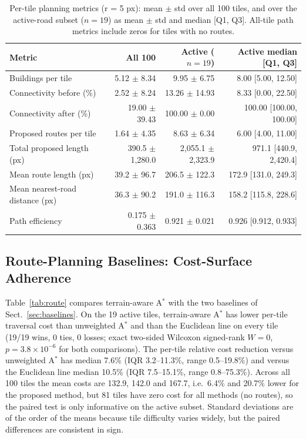 \documentclass[runningheads]{llncs}
\begin{document}
\begin{table}[t]
\caption{Per-tile planning metrics (r = 5 px): mean $\pm$ std over all 100 tiles, and over the active-road subset ($n=19$) as mean $\pm$ std and median [Q1, Q3]. All-tile path metrics include zeros for tiles with no routes.}\label{tab:n100}
\centering
\scriptsize
\setlength{\tabcolsep}{3pt}
\begin{tabular}{lrrr}
\toprule
Metric & All 100 & Active ($n=19$) & Active median [Q1, Q3]\\
\midrule
Buildings per tile & 5.12 $\pm$ 8.34 & 9.95 $\pm$ 6.75 & 8.00 [5.00, 12.50] \\
Connectivity before (\%) & 2.52 $\pm$ 8.24 & 13.26 $\pm$ 14.93 & 8.33 [0.00, 22.50] \\
Connectivity after (\%) & 19.00 $\pm$ 39.43 & 100.00 $\pm$ 0.00 & 100.00 [100.00, 100.00] \\
Proposed routes per tile & 1.64 $\pm$ 4.35 & 8.63 $\pm$ 6.34 & 6.00 [4.00, 11.00] \\
Total proposed length (px) & 390.5 $\pm$ 1,280.0 & 2,055.1 $\pm$ 2,323.9 & 971.1 [440.9, 2,420.4] \\
Mean route length (px) & 39.2 $\pm$ 96.7 & 206.5 $\pm$ 122.3 & 172.9 [131.0, 249.3] \\
Mean nearest-road distance (px) & 36.3 $\pm$ 90.2 & 191.0 $\pm$ 116.3 & 158.2 [115.8, 228.6] \\
Path efficiency & 0.175 $\pm$ 0.363 & 0.921 $\pm$ 0.021 & 0.926 [0.912, 0.933] \\
\bottomrule
\end{tabular}
\end{table}

\subsection{Route-Planning Baselines: Cost-Surface Adherence}
Table~\ref{tab:route} compares terrain-aware A$^{*}$ with the two baselines of Sect.~\ref{sec:baselines}. On the 19 active tiles, terrain-aware A$^{*}$ has lower per-tile traversal cost than unweighted A$^{*}$ and than the Euclidean line on every tile (19/19 wins, 0 ties, 0 losses; exact two-sided Wilcoxon signed-rank $W=0$, $p=3.8\times10^{-6}$ for both comparisons). The per-tile relative cost reduction versus unweighted A$^{*}$ has median 7.6\% (IQR 3.2--11.3\%, range 0.5--19.8\%) and versus the Euclidean line median 10.5\% (IQR 7.5--15.1\%, range 0.8--75.3\%). Across all 100 tiles the mean costs are 132.9, 142.0 and 167.7, i.e.\ 6.4\% and 20.7\% lower for the proposed method, but 81 tiles have zero cost for all methods (no routes), so the paired test is only informative on the active subset. Standard deviations are of the order of the means because tile difficulty varies widely, but the paired differences are consistent in sign.
\end{document}
